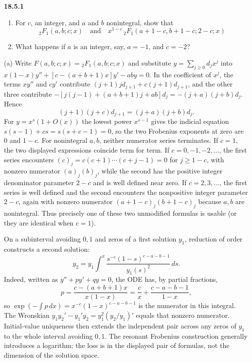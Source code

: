 \par\bigskip
\noindent\textbf{18.5.1}
\begin{enumerate}
\item[(a)] For $c$, an integer, and $a$ and $b$ nonintegral, show
that
\[
{}_{2}F_{1}(a,b;c;x)\quad\text{and}\quad
x^{1-c}\,{}_{2}F_{1}(a+1-c,b+1-c;2-c;x)
\]
\item[(b)] What happens if $a$ is an integer, say, $a=-1$, and
$c=-2$?
\end{enumerate}
\solution
(a) Write $F(a,b;c;x)={}_2F_1(a,b;c;x)$ and substitute
$y=\sum_{j\ge0}d_jx^j$ into
$x(1-x)y''+[c-(a+b+1)x]y'-aby=0$.  In the coefficient of $x^j$,
the terms $xy''$ and $cy'$ contribute $(j+1)jd_{j+1}+c(j+1)d_{j+1}$,
and the other three contribute
$-[j(j-1)+(a+b+1)j+ab]d_j=-(j+a)(j+b)d_j$.  Hence
\[
(j+1)(j+c)d_{j+1}=(j+a)(j+b)d_j.
\]
For $y=x^s(1+O(x))$ the lowest power $x^{s-1}$ gives the indicial
equation $s(s-1)+cs=s(s+c-1)=0$, so the two Frobenius exponents at
zero are $0$ and $1-c$.
For nonintegral $a,b$, neither numerator series terminates.
If $c=1$, the two displayed expressions coincide term for term.
If $c=0,-1,-2,\ldots$, the first series encounters
$(c)_j=c(c+1)\cdots(c+j-1)=0$ for $j\ge1-c$, with nonzero
numerator $(a)_j(b)_j$, while the second has the positive integer
denominator parameter $2-c$ and is well defined near zero.
If $c=2,3,\ldots$, the first series is well defined and the
second encounters the nonpositive integer parameter $2-c$, again
with nonzero numerator $(a+1-c)_j(b+1-c)_j$ because $a,b$ are
nonintegral.
Thus precisely one of these two unmodified formulas is usable
(or they are identical when $c=1$).

On a subinterval avoiding $0,1$ and zeros of a first solution
$y_1$, reduction of order constructs a second solution:
\[
y_2=y_1\int^x\frac{s^{-c}(1-s)^{c-a-b-1}}{y_1(s)^2}\,ds.
\]
Indeed, written as $y''+py'+qy=0$, the ODE has, by partial
fractions,
\[
p=\frac{c-(a+b+1)x}{x(1-x)}=\frac cx+\frac{c-a-b-1}{1-x},
\]
so $\exp(-\int p\,dx)=x^{-c}(1-x)^{c-a-b-1}$ is the numerator in
this integral.  The Wronskian $y_1y_2'-y_1'y_2=y_1^2(y_2/y_1)'$
equals that nonzero numerator.
Initial-value uniqueness then extends the independent pair across any
zeros of $y_1$ to the whole interval avoiding $0,1$.
The resonant Frobenius construction generally introduces a logarithm;
the loss is in the displayed pair of formulas, not the dimension
of the solution space.

